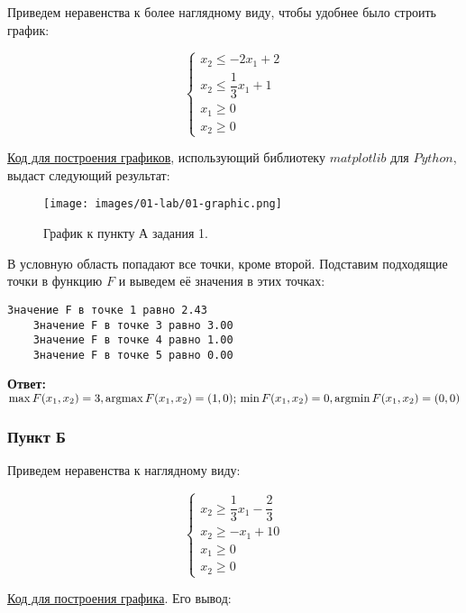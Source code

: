 Приведем неравенства к более наглядному виду, чтобы удобнее было строить график:

\[
    \begin{cases}
        x_2 \leq -2x_1 + 2           \\
        x_2 \leq \dfrac{1}{3}x_1 + 1 \\
        x_1 \geq 0                   \\
        x_2 \geq 0
    \end{cases}
\]

\href{https://github.com/retrobannerS/optimization_methods/blob/main/python/01-lab/A.%2001.py}{Код для построения графиков}, использующий библиотеку $matplotlib$ для $Python$, выдаст следующий результат:

\begin{figure}[H]
    \texttt{[image: images/01-lab/01-graphic.png]}
    \caption{График к пункту А задания 1.}
    \label{01-lab-01-graphic}
\end{figure}

В условную область попадают все точки, кроме второй. Подставим подходящие точки в функцию $F$ и выведем её значения в этих точках:

\begin{lstlisting}[language=text]
    Значение F в точке 1 равно 2.43
    Значение F в точке 3 равно 3.00
    Значение F в точке 4 равно 1.00
    Значение F в точке 5 равно 0.00
\end{lstlisting}

\textbf{Ответ:} $\max F(x_1, x_2) = 3, \operatorname*{argmax} F(x_1, x_2) = (1, 0);\\
    \min F(x_1, x_2) = 0, \operatorname*{argmin} F(x_1, x_2) = (0, 0)$ \label{01-lab-a-answer}

\subsubsection{Пункт Б}\label{01-lab-b}

Приведем неравенства к наглядному виду:

\[
    \begin{cases}
        x_2 \geq \dfrac{1}{3} x_1 - \dfrac{2}{3} \\
        x_2 \geq -x_1 + 10                       \\
        x_1 \geq 0                               \\
        x_2 \geq 0
    \end{cases}
\]

\href{https://github.com/retrobannerS/optimization_methods/blob/main/python/01-lab/B.%2001.py}{Код для построения графика}. Его вывод:

